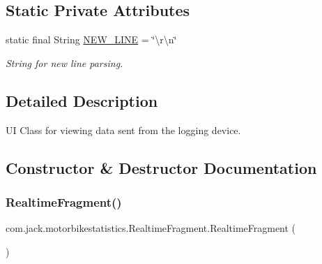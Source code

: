 \subsection*{Static Private Attributes}
\begin{DoxyCompactItemize}
\item 
\mbox{\label{classcom_1_1jack_1_1motorbikestatistics_1_1_realtime_fragment_a6a531a688878f758b89c7f30d0798d07}} 
static final String \hyperlink{classcom_1_1jack_1_1motorbikestatistics_1_1_realtime_fragment_a6a531a688878f758b89c7f30d0798d07}{N\+E\+W\+\_\+\+L\+I\+NE} = \char`\"{}\textbackslash{}r\textbackslash{}n\char`\"{}
\begin{DoxyCompactList}\small\item\em String for new line parsing. \end{DoxyCompactList}\end{DoxyCompactItemize}


\subsection{Detailed Description}
UI Class for viewing data sent from the logging device. 

\subsection{Constructor \& Destructor Documentation}
\mbox{\label{classcom_1_1jack_1_1motorbikestatistics_1_1_realtime_fragment_a159b590184ccba28da3763c211edc82f}} 
\subsubsection{\texorpdfstring{Realtime\+Fragment()}{RealtimeFragment()}}
{\footnotesize\ttfamily com.\+jack.\+motorbikestatistics.\+Realtime\+Fragment.\+Realtime\+Fragment (\begin{DoxyParamCaption}{ }\end{DoxyParamCaption})\hspace{0.3cm}{\ttfamily [inline]}}



